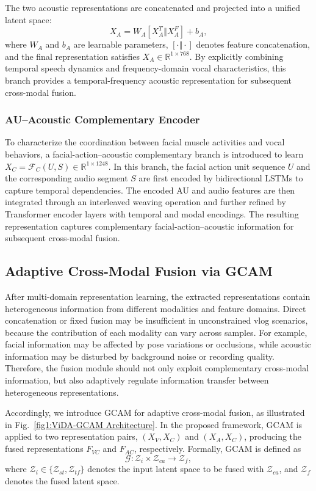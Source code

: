 \documentclass[a4paper,fleqn]{cas-dc}
\begin{document}
The two acoustic representations are concatenated and projected into a unified latent space:
\begin{equation}
X_A = W_A [X_A^T \Vert X_A^F] + b_A,
\end{equation}
where $W_A$ and $b_A$ are learnable parameters, $[\cdot \Vert \cdot]$ denotes feature concatenation, and the final representation satisfies $X_A \in \mathbb{R}^{1\times 768}$. By explicitly combining temporal speech dynamics and frequency-domain vocal characteristics, this branch provides a temporal-frequency acoustic representation for subsequent cross-modal fusion.


\subsubsection{AU--Acoustic Complementary Encoder}
To characterize the coordination between facial muscle activities and vocal behaviors, a facial-action--acoustic complementary branch is introduced to learn $X_C=\mathcal{F}_C(U,S)\in\mathbb{R}^{1\times 1248}$. In this branch, the facial action unit sequence $U$ and the corresponding audio segment $S$ are first encoded by bidirectional LSTMs to capture temporal dependencies. The encoded AU and audio features are then integrated through an interleaved weaving operation and further refined by Transformer encoder layers with temporal and modal encodings. The resulting representation captures complementary facial-action–acoustic information for subsequent cross-modal fusion.


\subsection{Adaptive Cross-Modal Fusion via GCAM}

After multi-domain representation learning, the extracted representations contain heterogeneous information from different modalities and feature domains. Direct concatenation or fixed fusion may be insufficient in unconstrained vlog scenarios, because the contribution of each modality can vary across samples. For example, facial information may be affected by pose variations or occlusions, while acoustic information may be disturbed by background noise or recording quality. Therefore, the fusion module should not only exploit complementary cross-modal information, but also adaptively regulate information transfer between heterogeneous representations.


Accordingly, we introduce GCAM for adaptive cross-modal fusion, as illustrated in Fig.~\ref{fig1:ViDA-GCAM Architecture}. In the proposed framework, GCAM is applied to two representation pairs, $(X_V, X_C)$ and $(X_A, X_C)$, producing the fused representations $F_{VC}$ and $F_{AC}$, respectively. Formally, GCAM is defined as
\begin{equation}
\mathcal{G}: \mathcal{Z}_i \times \mathcal{Z}_{ca} \rightarrow \mathcal{Z}_f,
\end{equation}
where $\mathcal{Z}_i \in \{\mathcal{Z}_{st}, \mathcal{Z}_{tf}\}$ denotes the input latent space to be fused with $\mathcal{Z}_{ca}$, and $\mathcal{Z}_f$ denotes the fused latent space.
\end{document}
